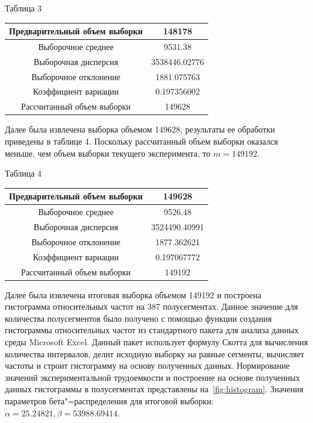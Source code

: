 \documentclass[a4paper,fontsize=14pt]{article}
\begin{document}
\begin{center}
	\label{table3}
	Таблица 3 \\
	\hfill \break
	\begin{tabular}{|c|c|}
		\hline
		Предварительный объем выборки & 148178 \\
		\hline
		Выборочное среднее & 9531.38 \\
		\hline
		Выборочная дисперсия & 3538446.02776 \\
		\hline
		Выборочное отклонение & 1881.075763 \\
		\hline
		Коэффициент вариации & 0.197356002 \\
		\hline
		Рассчитанный объем выборки & 149628 \\
		\hline
	\end{tabular}
\end{center}

Далее была извлечена выборка объемом 149628, результаты ее обработки приведены в таблице 4. Поскольку рассчитанный объем выборки оказался меньше, чем объем выборки текущего эксперимента, то $m = 149192$.

\begin{center}
	\label{table4}
	Таблица 4 \\
	\hfill \break
	\begin{tabular}{|c|c|}
		\hline
		Предварительный объем выборки & 149628 \\
		\hline
		Выборочное среднее & 9526.48 \\
		\hline
		Выборочная дисперсия & 3524490.40991 \\
		\hline
		Выборочное отклонение & 1877.362621 \\
		\hline
		Коэффициент вариации & 0.197067772 \\
		\hline
		Рассчитанный объем выборки & 149192 \\
		\hline
	\end{tabular}
\end{center}

Далее была извлечена итоговая выборка объемом 149192 и построена гистограмма относительных частот на 387 полусегментах. Данное значение для количества полусегментов было получено с помощью функции создания гистограммы относительных частот из стандартного пакета для анализа данных среды Microsoft Excel. Данный пакет использует формулу Скотта для вычисления количества интервалов, делит исходную выборку на равные сегменты, вычисляет частоты и строит гистограмму на основу полученных данных. Нормирование значений экспериментальной трудоемкости и построение на основе полученных данных гистограммы в полусегментах представлены на~\ref{fig:histogram}. Значения параметров бета"=распределения для итоговой выборки: $\alpha = 25.24821, \beta = 53988.69414$.
\end{document}
